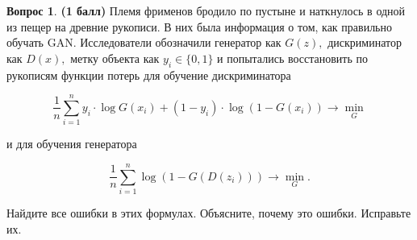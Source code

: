 \documentclass[12pt]{article}
\theoremstyle{definition}
\newtheorem{question}{Вопрос}
\begin{document}
\begin{question} \textbf{(1 балл)} \newline
    Племя фрименов бродило по пустыне и наткнулось в одной из пещер на древние рукописи. В них была информация о том, как правильно обучать GAN. Исследователи обозначили генератор как $G(z),$ дискриминатор как $D(x),$ метку объекта как $y_i \in \{0,1\}$ и попытались восстановить по рукописям функции потерь для обучение дискриминатора 
    
    $$
    \frac{1}{n} \sum_{i=1}^n y_i \cdot \log G(x_i) + (1 - y_i) \cdot \log(1 - G(x_i)) \to \min_G
    $$
    
    и для обучения генератора
    
    $$
    \frac{1}{n} \sum_{i=1}^n \log(1 - G(D(z_i))) \to \min_G.
    $$
    
    Найдите все ошибки в этих формулах. Объясните, почему это ошибки. Исправьте их. 
\end{question}
\end{document}
